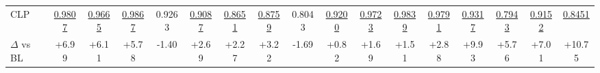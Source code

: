 \begin{tabular}{lcccccccccccccccc}
CLP & \cellcolor{orange!25}\underline{0.9807} & \cellcolor{orange!25}\underline{0.9665} & \cellcolor{orange!25}\underline{0.9867} & 0.9263 & \cellcolor{orange!25}\underline{0.9087} & \cellcolor{orange!25}\underline{0.8651} & \cellcolor{orange!25}\underline{0.8759} & 0.8043 & \cellcolor{orange!25}\underline{0.9200} & \cellcolor{orange!25}\underline{0.9723} & \cellcolor{orange!25}\underline{0.9839} & \cellcolor{orange!25}\underline{0.9791} & \cellcolor{orange!25}\underline{0.9317} & \cellcolor{orange!25}\underline{0.7943} & \cellcolor{orange!25}\underline{0.9152} & \cellcolor{orange!25}\underline{0.8451} \\
\hspace*{1em}$\Delta$ vs BL & \textcolor{green!60!black}{+6.99} & \textcolor{green!60!black}{+6.11} & \textcolor{green!60!black}{+5.78} & \textcolor{orange!85!black}{-1.40} & \textcolor{green!60!black}{+2.69} & \textcolor{green!60!black}{+2.27} & \textcolor{green!60!black}{+3.22} & \textcolor{orange!85!black}{-1.69} & \textcolor{green!60!black}{+0.82} & \textcolor{green!60!black}{+1.69} & \textcolor{green!60!black}{+1.51} & \textcolor{green!60!black}{+2.88} & \textcolor{green!60!black}{+9.93} & \textcolor{green!60!black}{+5.76} & \textcolor{green!60!black}{+7.01} & \textcolor{green!60!black}{+10.75} \\
\bottomrule
\end{tabular}
